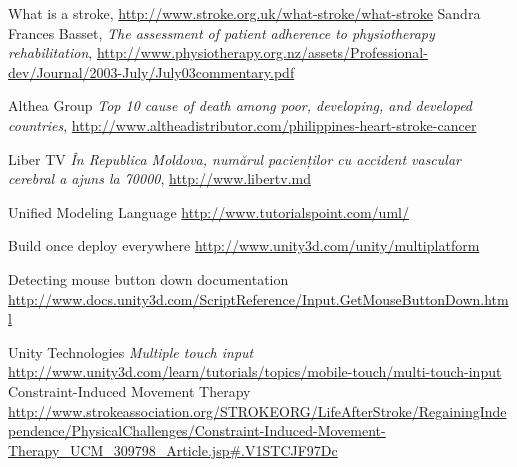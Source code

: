 \begin{thebibliography}{99999}
\singlespace\normalsize

 What is a stroke, \url{http://www.stroke.org.uk/what-stroke/what-stroke}
 Sandra Frances Basset, \textit{ The assessment of patient adherence to physiotherapy
rehabilitation}, \url {http://www.physiotherapy.org.nz/assets/Professional-dev/Journal/2003-July/July03commentary.pdf}

 Althea Group \textit{ Top 10 cause of death among poor, developing, and developed countries}, \url {http://www.altheadistributor.com/philippines-heart-stroke-cancer}

 Liber TV \textit{În Republica Moldova, numărul pacienților cu accident vascular cerebral a ajuns la 70000}, \url{http://www.libertv.md}


 Unified Modeling Language \url{http://www.tutorialspoint.com/uml/}

 Build once deploy everywhere \url {http://www.unity3d.com/unity/multiplatform}

 Detecting mouse button down documentation \url {http://www.docs.unity3d.com/ScriptReference/Input.GetMouseButtonDown.html}

 Unity Technologies \textit{Multiple touch input} \url{http://www.unity3d.com/learn/tutorials/topics/mobile-touch/multi-touch-input}
 Constraint-Induced Movement Therapy \url{http://www.strokeassociation.org/STROKEORG/LifeAfterStroke/RegainingIndependence/PhysicalChallenges/Constraint-Induced-Movement-Therapy_UCM_309798_Article.jsp#.V1STCJF97Dc}
\end{thebibliography}
